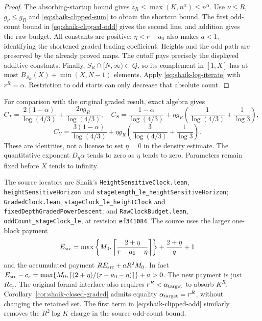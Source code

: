 \documentclass[11pt]{article}
\theoremstyle{remark}\newtheorem{remark}[proposition]{Remark}
\begin{document}
\begin{proof}
The absorbing-startup bound gives
\(z_R\le\max(K,n^\alpha)\le n^\alpha\).
Use \(\nu\le R\), \(g_\nu\le g_R\) and
\eqref{eq:shaik-clipped-sum} to obtain the shortcut bound.
The first odd-count bound in \eqref{eq:shaik-clipped-odd} gives the
second line, and addition gives the raw budget. All constants are
positive; \(\eta<r-a_0\) also makes \(a<1\), identifying the shortened
graded leading coefficient. Heights and the odd path are preserved
by the already proved maps. The cutoff pays precisely the displayed
additive constants. Finally,
\(S_R\cap[N,\infty)\subset Q\), so its complement in \([1,X]\)
has at most \(B_{S_R}(X)+\min(X,N-1)\) elements. Apply
\eqref{eq:shaik-log-iterate} with \(r^R=\alpha\).
Restriction to odd starts can only decrease that absolute count.
\end{proof}

For comparison with the original graded result, exact algebra gives
\[
 C_T=\frac{2(1-\alpha)}{\log(4/3)}
       +\frac{2\eta g_R}{\log(4/3)},\quad
 C_S=\frac{1-\alpha}{\log(4/3)}
       +\eta g_R\left(\frac1{\log(4/3)}+\frac1{\log3}\right),
\]
\[
 C_U=\frac{3(1-\alpha)}{\log(4/3)}
       +\eta g_R\left(\frac3{\log(4/3)}+\frac1{\log3}\right).
\]
These are identities, not a license to set \(\eta=0\) in the density
estimate. The quantitative exponent \(D_\eta\alpha\) tends to zero
as \(\eta\) tends to zero. Parameters remain fixed before \(X\)
tends to infinity.

The source locators are Shaik's \texttt{HeightSensitiveClock.lean},
\texttt{heightSensitiveHorizon} and
\texttt{stageLength\_le\_heightSensitiveHorizon};
\texttt{GradedClock.lean}, \texttt{stageClock\_le\_heightClock} and
\texttt{fixedDepthGradedPowerDescent}; and
\texttt{RawClockBudget.lean}, \texttt{oddCount\_stageClock\_le},
at revision \texttt{ef341084}.
The source uses the larger one-block payment
\[
 E_{\rm src}=
 \max\left\{M_0,\left\lceil\frac{2+\eta}{r-a_0-\eta}\right\rceil\right\}
       +\frac{2+\eta}{g}+1
\]
and the accumulated payment
\(R E_{\rm src}+aR^2M_0\). In fact
\(E_{\rm src}-c_r=
 \max\{M_0,\lceil(2+\eta)/(r-a_0-\eta)\rceil\}+a>0\).
The new payment is just \(Rc_r\). The original formal interface also
requires \(r^R<\alpha_{\rm target}\) to absorb \(K^R\).
Corollary~\ref{cor:shaik-closed-graded} admits equality
\(\alpha_{\rm target}=r^R\), without changing the retained set.
The first term in \eqref{eq:shaik-clipped-odd} similarly removes
the \(R^2\log K\) charge in the source odd-count bound.
\end{document}
